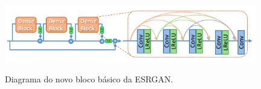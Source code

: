 \begin{figure}[H]
    \centering
    \caption{Diagrama do novo bloco básico da ESRGAN.}
    \includegraphics[width=11cm]{fig/new-basic-block.png}
    \label{fig:fig13}
\end{figure} 
